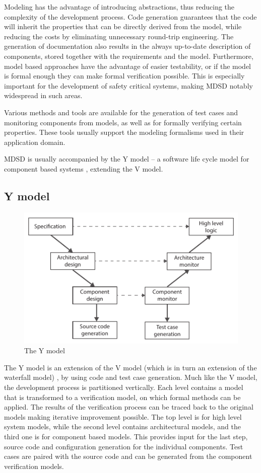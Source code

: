 Modeling has the advantage of introducing abstractions, thus reducing the complexity of the development process. Code generation guarantees that the code will inherit the properties that can be directly derived from the model, while reducing the costs by eliminating unnecessary round-trip engineering. The generation of documentation also results in the always up-to-date description of components, stored together with the requirements and the model. Furthermore, model based approaches have the advantage of easier testability, or if the model is formal enough they can make formal verification possible. This is especially important for the development of safety critical systems, making MDSD notably widespread in such areas.

Various methods and tools are available for the generation of test cases and monitoring components from models, as well as for formally verifying certain properties. These tools usually support the modeling formalisms used in their application domain.

MDSD is usually accompanied by the Y model -- a software life cycle model for component based systems \citep{ymodel}, extending the V model.

\subsection{Y model} %

\begin{figure}[h]
	\centering
	\includegraphics[width=0.8\linewidth]{include/figures/chapter_1/YModel}
	\caption{The Y model}
	\label{fig:intro:vmodel}
\end{figure}

The Y model \citep{ymodel} is an extension of the V model (which is in turn an extension of the waterfall model) \citep{randomwikipedialink3}, by using code and test case generation. Much like the V model, the development process is partitioned vertically. Each level contains a model that is transformed to a verification model, on which formal methods can be applied. The results of the verification process can be traced back to the original models making iterative improvement possible. The top level is for high level system models, while the second level contains architectural models, and the third one is for component based models. This provides input for the last step, source code and configuration generation for the individual components. Test cases are paired with the source code and can be generated from the component verification models.

